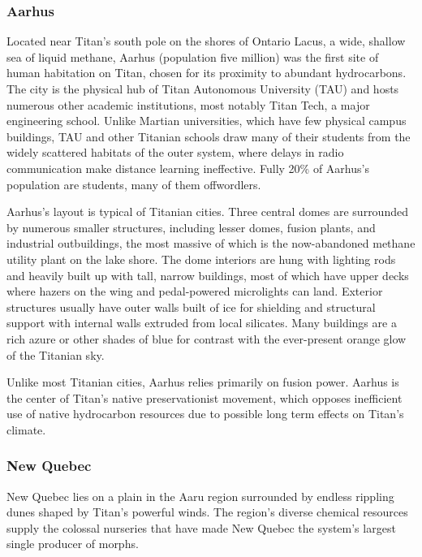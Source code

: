 \subsubsection{Aarhus}
\label{sec:aarhus}

Located near Titan's south pole on the shores of Ontario Lacus, a
wide, shallow sea of liquid methane, Aarhus (population five million)
was the first site of human habitation on Titan, chosen for its
proximity to abundant hydrocarbons. The city is the physical hub of
Titan Autonomous University (TAU) and hosts numerous other academic
institutions, most notably Titan Tech, a major engineering
school. Unlike Martian universities, which have few physical campus
buildings, TAU and other Titanian schools draw many of their students
from the widely scattered habitats of the outer system, where delays
in radio communication make distance learning ineffective.  Fully 20\%
of Aarhus's population are students, many of them offwordlers.

Aarhus's layout is typical of Titanian cities. Three central domes are
surrounded by numerous smaller structures, including lesser domes,
fusion plants, and industrial outbuildings, the most massive of which
is the now-abandoned methane utility plant on the lake shore. The dome
interiors are hung with lighting rods and heavily built up with tall,
narrow buildings, most of which have upper decks where hazers on the
wing and pedal-powered microlights can land. Exterior structures
usually have outer walls built of ice for shielding and structural
support with internal walls extruded from local silicates. Many
buildings are a rich azure or other shades of blue for contrast with
the ever-present orange glow of the Titanian sky.

Unlike most Titanian cities, Aarhus relies primarily on fusion
power. Aarhus is the center of Titan's native preservationist
movement, which opposes inefficient use of native hydrocarbon
resources due to possible long term effects on Titan's climate.

\subsubsection{New Quebec}
\label{sec:new-quebec}

New Quebec lies on a plain in the Aaru region surrounded by endless
rippling dunes shaped by Titan's powerful winds. The region's diverse
chemical resources supply the colossal nurseries that have made New
Quebec the system's largest single producer of morphs.

